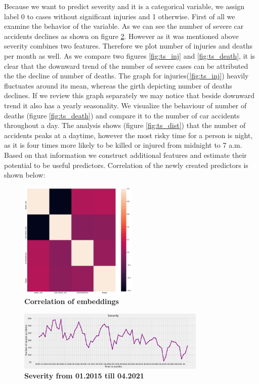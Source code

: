 Because we want to predict severity and it is a categorical variable, we assign label 0 to cases without significant injuries and 1 otherwise.
First of all we examine the behavior of the variable. As we can see the number of severe car accidents declines as shown on figure \ref{fig:ts_sev}.
However as it was mentioned above severity combines two features.
Therefore we plot number of injuries and deaths per month as well.
As we compare two figures \ref{fig:ts_inj} and \ref{fig:ts_death}, it is clear that the downward trend of the number of severe cases can be attributed the the decline of number of deaths.
The graph for injuries(\ref{fig:ts_inj}) heavily fluctuates around its mean, whereas the girth depicting number of deaths declines. 
If we review this graph separately we may notice that beside downward trend it also has a yearly seasonality.
We visualize the behaviour of number of deaths (figure \ref{fig:ts_death}) and compare it to the number of car accidents throughout a day.
The analysis shows (figure \ref{fig:ts_dist}) that the number of accidents peaks at a daytime, however the most risky time for a person is night,
as it is four times more likely to be killed or injured from midnight to 7 a.m. 
Based on that information we construct additional features and estimate their potential to be useful predictors.
Correlation of the newly created predictors is shown below:
\begin{figure}[htpb]
	\centering
	\includegraphics[width=0.5\textwidth]{../imgs/pdf_files/new_embeddings_correlation.pdf}
	\caption{\textbf{Correlation of embeddings}}
	\label{fig:new_embed}
\end{figure}

\begin{figure}[htpb]
	\centering
	\includegraphics[width=0.8\textwidth]{../imgs/pdf_files/ts_severity.pdf}
	\caption{\textbf{Severity from 01.2015 till 04.2021}}
	\label{fig:ts_sev}
\end{figure}

